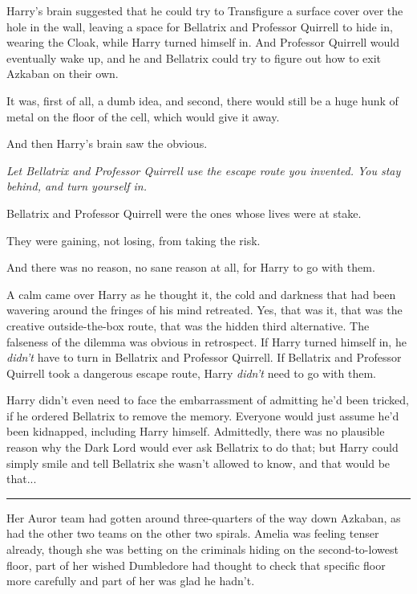 Harry's brain suggested that he could try to Transfigure a surface cover
over the hole in the wall, leaving a space for Bellatrix and Professor
Quirrell to hide in, wearing the Cloak, while Harry turned himself in.
And Professor Quirrell would eventually wake up, and he and Bellatrix
could try to figure out how to exit Azkaban on their own.

It was, first of all, a dumb idea, and second, there would still be a
huge hunk of metal on the floor of the cell, which would give it away.

And then Harry's brain saw the obvious.

\emph{Let Bellatrix and Professor Quirrell use the escape route you
invented. You stay behind, and turn yourself in.}

Bellatrix and Professor Quirrell were the ones whose lives were at
stake.

They were gaining, not losing, from taking the risk.

And there was no reason, no sane reason at all, for Harry to go with
them.

A calm came over Harry as he thought it, the cold and darkness that had
been wavering around the fringes of his mind retreated. Yes, that was
it, that was the creative outside-the-box route, that was the hidden
third alternative. The falseness of the dilemma was obvious in
retrospect. If Harry turned himself in, he \emph{didn't} have to turn in
Bellatrix and Professor Quirrell. If Bellatrix and Professor Quirrell
took a dangerous escape route, Harry \emph{didn't} need to go with them.

Harry didn't even need to face the embarrassment of admitting he'd been
tricked, if he ordered Bellatrix to remove the memory. Everyone would
just assume he'd been kidnapped, including Harry himself. Admittedly,
there was no plausible reason why the Dark Lord would ever ask Bellatrix
to do that; but Harry could simply smile and tell Bellatrix she wasn't
allowed to know, and that would be that...

\begin{center}\rule{3in}{0.4pt}\end{center}

Her Auror team had gotten around three-quarters of the way down Azkaban,
as had the other two teams on the other two spirals. Amelia was feeling
tenser already, though she was betting on the criminals hiding on the
second-to-lowest floor, part of her wished Dumbledore had thought to
check that specific floor more carefully and part of her was glad he
hadn't.

